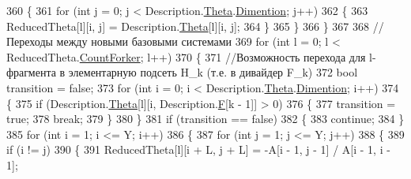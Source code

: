 \begin{DoxyCode}
360                 \{
361                     \textcolor{keywordflow}{for} (\textcolor{keywordtype}{int} j = 0; j < Description.\hyperlink{class_network_descriptions_1_1_description_o_f_j_q_n_af8d4bf8f19a4db2daef14d0dafd77a00}{Theta}.\hyperlink{class_network_descriptions_1_1_routing_matrix_a417bebac18f3b241d4e40d55d9b44213}{Dimention}; j++)
362                     \{
363                         ReducedTheta[l][i, j] = Description.\hyperlink{class_network_descriptions_1_1_description_o_f_j_q_n_af8d4bf8f19a4db2daef14d0dafd77a00}{Theta}[l][i, j];
364                     \}
365                 \}
366             \}
367 
368             \textcolor{comment}{//Переходы между новыми базовыми системами}
369             \textcolor{keywordflow}{for} (\textcolor{keywordtype}{int} l = 0; l < ReducedTheta.\hyperlink{class_network_descriptions_1_1_routing_matrix_a38f3c4bb00bf84fdeb4fd2c3dbdc9bfb}{CountForker}; l++)
370             \{
371                 \textcolor{comment}{//Возможность перехода для l-фрагмента в элементарную подсеть H\_k (т.е. в дивайдер F\_k)}
372                 \textcolor{keywordtype}{bool} transition = \textcolor{keyword}{false};
373                 \textcolor{keywordflow}{for} (\textcolor{keywordtype}{int} i = 0; i < Description.\hyperlink{class_network_descriptions_1_1_description_o_f_j_q_n_af8d4bf8f19a4db2daef14d0dafd77a00}{Theta}.\hyperlink{class_network_descriptions_1_1_routing_matrix_a417bebac18f3b241d4e40d55d9b44213}{Dimention}; i++)
374                 \{
375                     \textcolor{keywordflow}{if} (Description.\hyperlink{class_network_descriptions_1_1_description_o_f_j_q_n_af8d4bf8f19a4db2daef14d0dafd77a00}{Theta}[l][i, Description.\hyperlink{class_network_descriptions_1_1_description_o_f_j_q_n_aaadbe1cc3f0bdb0bef593d2b732c988f}{F}[k - 1]] > 0)
376                     \{
377                         transition = \textcolor{keyword}{true};
378                         \textcolor{keywordflow}{break};
379                     \}
380                 \}
381                 \textcolor{keywordflow}{if} (transition == \textcolor{keyword}{false})
382                 \{
383                     \textcolor{keywordflow}{continue};
384                 \}
385                 \textcolor{keywordflow}{for} (\textcolor{keywordtype}{int} i = 1; i <= Y; i++)
386                 \{
387                     \textcolor{keywordflow}{for} (\textcolor{keywordtype}{int} j = 1; j <= Y; j++)
388                     \{
389                         \textcolor{keywordflow}{if} (i != j)
390                         \{
391                             ReducedTheta[l][i + L, j + L] = -A[i - 1, j - 1] / A[i - 1, i - 1];

\end{DoxyCode}
